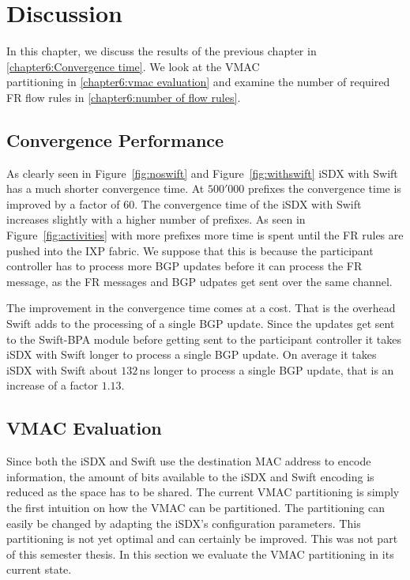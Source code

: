 \chapter{\label{chapter6}Discussion}

In this chapter, we discuss the results of the previous chapter in \ref{chapter6:Convergence time}. We look at the VMAC \\ partitioning in \ref{chapter6:vmac evaluation} and examine the number of required FR flow rules in \ref{chapter6:number of flow rules}.

\section{\label{chapter6:Convergence time}Convergence Performance}

As clearly seen in Figure~\ref{fig:noswift} and Figure~\ref{fig:withswift} iSDX with Swift has a much shorter convergence time. At $500'000$ prefixes the convergence time is improved by a factor of $60$. The convergence time of the iSDX with Swift increases slightly with a higher number of prefixes. As seen in Figure~\ref{fig:activities} with more prefixes more time is spent until the FR rules are pushed into the IXP fabric. We suppose that this is because the participant controller has to process more BGP updates before it can process the FR message, as the FR messages and BGP udpates get sent over the same channel.

The improvement in the convergence time comes at a cost. That is the overhead Swift adds to the processing of a single BGP update. Since the updates get sent to the Swift-BPA module before getting sent to the participant controller it takes iSDX with Swift longer to process a single BGP update. On average it takes iSDX with Swift about $132$\,ns longer to process a single BGP update, that is an increase of a factor $1.13$. 

\section{\label{chapter6:vmac evaluation}VMAC Evaluation}

Since both the iSDX and Swift use the destination MAC address to encode information, the amount of bits available to the iSDX and Swift encoding is reduced as the space has to be shared. The current VMAC partitioning is simply the first intuition on how the VMAC can be partitioned. The partitioning can easily be changed by adapting the iSDX's configuration parameters. This partitioning is not yet optimal and can certainly be improved. This was not part of this semester thesis. In this section we evaluate the VMAC partitioning in its current state.


